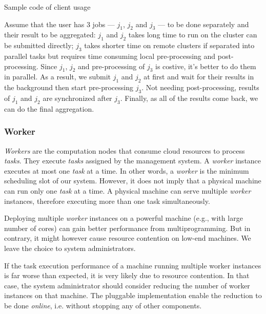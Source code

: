 \begin{Example Code}
  
  \caption{Sample code of client usage}
\end{Example Code}

Assume that the user has 3 jobs --- $j_1$, $j_2$ and $j_3$ --- to be
done separately and their result to be aggregated:  $j_1$ and $j_2$
takes long time to run on the cluster can be submitted directly; $j_3$
takes shorter time on remote clusters if separated into parallel tasks
but requires time consuming local pre-processing and post-processing.
Since $j_1$, $j_2$ and pre-processing of $j_3$ is costive, it's better
to do them in parallel.
As a result, we submit $j_1$ and $j_2$ at first and wait for their
results in the background then start pre-processing $j_3$.
Not needing post-processing, results of $j_1$ and $j_2$ are synchronized
after $j_3$.
Finally, as all of the results come back, we can do the final
aggregation.


\subsubsection{Worker}	%

{\em Workers} are the computation nodes that consume cloud resources to
process {\em tasks}.
They execute {\em tasks} assigned by the management system.
A {\em worker} instance executes at most one {\em task} at a time.
In other words, a {\em worker} is the minimum scheduling slot of our
system.
However, it does not imply that a physical machine can run only one {\em
task} at a time.
A physical machine can serve multiple {\em worker} instances, therefore
executing more than one task simultaneously.

Deploying multiple {\em worker} instances on a powerful machine (e.g.,
with large number of cores) can gain better performance from
multiprogramming.
But in contrary, it might however cause resource contention on low-end
machines.
We leave the choice to system administrators.

If the task execution performance of a machine running multiple worker
instances is far worse than expected, it is very likely due to resource
contention.
In that case, the system administrator should consider reducing the
number of worker instances on that machine.
The pluggable implementation enable the reduction to be done {\em
online}, i.e. without stopping any of other components.


